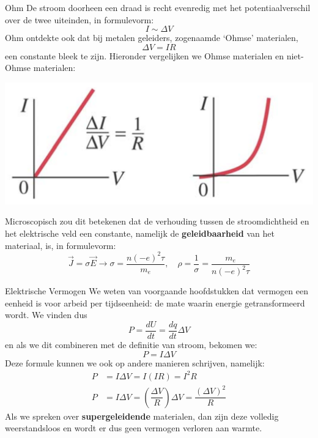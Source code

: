 \newpage

\begin{lem}[Ohm]{Ohm}
    De stroom doorheen een draad is recht evenredig met het potentiaalverschil over de twee uiteinden, in formulevorm:
    \begin{equation*}
         I \sim \Delta V
    \end{equation*}
    Ohm ontdekte ook dat bij metalen geleiders, zogenaamde `Ohmse' materialen,
    \begin{equation*}
         \Delta V= IR 
    \end{equation*}
    een constante bleek te zijn. Hieronder vergelijken we Ohmse materialen en niet-Ohmse materialen:
    \begin{center}
        \includegraphics[scale = 0.2]{Images/Elektriciteit/GrafiekOhmseMaterialen.png}
    \end{center}
    Microscopisch zou dit betekenen dat de verhouding tussen de stroomdichtheid en het elektrische veld een constante, namelijk de \textbf{geleidbaarheid} van het materiaal, is, in formulevorm: 
    \begin{equation*}
        \Vec{J} = \sigma \Vec{E} \rightarrow \sigma = \dfrac{n(-e)^2\tau}{m_e}, \quad \rho = \dfrac{1}{\sigma} = \dfrac{m_e}{n(-e)^2\tau}
    \end{equation*}
\end{lem}

\begin{theo}{Elektrische Vermogen}
    We weten van voorgaande hoofdstukken dat vermogen een eenheid is voor arbeid per tijdseenheid: de mate waarin energie getransformeerd wordt. We vinden dus
    \begin{equation*}
        P = \dfrac{dU}{dt} = \dfrac{dq}{dt}\Delta V
    \end{equation*}
    en als we dit combineren met de definitie van stroom, bekomen we:
    \begin{equation*}
        P = I\Delta V
    \end{equation*}
    Deze formule kunnen we ook op andere manieren schrijven, namelijk:
    \begin{align*}
        P &=  I\Delta V= I(IR) = I^2R\\
        P &= I\Delta V = (\dfrac{\Delta V}{R})\Delta V = \dfrac{(\Delta V)^2}{R}
    \end{align*}
    Als we spreken over \textbf{supergeleidende} materialen, dan zijn deze volledig weerstandsloos en wordt er dus geen vermogen verloren aan warmte.
\end{theo}

